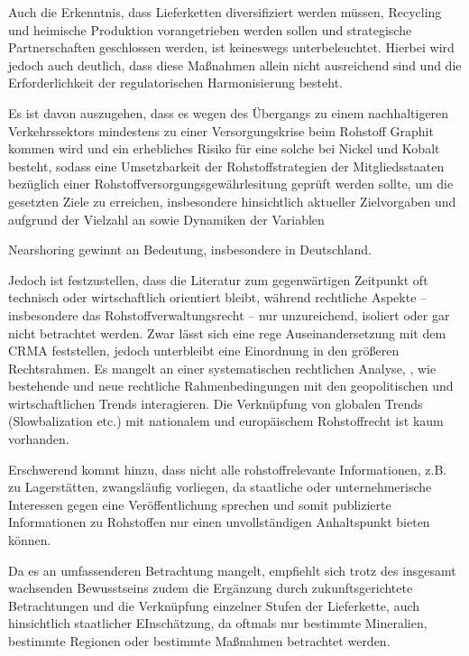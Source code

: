\documentclass[12pt,a4paper,oneside]{book} %
\begin{document}
Auch die Erkenntnis, dass Lieferketten diversifiziert werden müssen, Recycling und heimische Produktion vorangetrieben werden sollen und strategische Partnerschaften geschlossen werden, ist keineswegs unterbeleuchtet.\autocite{https://klardenker.kpmg.de/so-sichert-sich-die-automobilindustrie-kritische-rohstoffe-2/} Hierbei wird jedoch auch deutlich, dass diese Maßnahmen allein nicht ausreichend sind und die Erforderlichkeit der regulatorischen Harmonisierung besteht.

Es ist davon auszugehen, dass es wegen des Übergangs zu einem nachhaltigeren Verkehrssektors mindestens zu einer Versorgungskrise beim Rohstoff Graphit kommen wird und ein erhebliches Risiko für eine solche bei Nickel und Kobalt besteht, sodass eine Umsetzbarkeit der Rohstoffstrategien der Mitgliedsstaaten bezüglich einer Rohstoffversorgungsgewährlesitung geprüft werden sollte, um die gesetzten Ziele zu erreichen, insbesondere hinsichtlich aktueller Zielvorgaben und aufgrund der Vielzahl an sowie Dynamiken der Variablen\autocite{Nagy, Will the EU have enough minerals to drive their electric dreams by 2030?}

Nearshoring gewinnt an Bedeutung, insbesondere in Deutschland.

Jedoch ist festzustellen, dass die Literatur zum gegenwärtigen Zeitpunkt oft technisch oder wirtschaftlich orientiert bleibt, während rechtliche Aspekte -- insbesondere das Rohstoffverwaltungsrecht -- nur unzureichend, isoliert oder gar nicht betrachtet werden. Zwar lässt sich eine rege Auseinandersetzung mit dem CRMA feststellen, jedoch unterbleibt eine Einordnung in den größeren Rechtsrahmen. Es mangelt an einer systematischen rechtlichen Analyse, , wie bestehende und neue rechtliche Rahmenbedingungen mit den geopolitischen und wirtschaftlichen Trends interagieren. Die Verknüpfung von globalen Trends (Slowbalization etc.) mit nationalem und europäischem Rohstoffrecht ist kaum vorhanden.



Erschwerend kommt hinzu, dass nicht alle rohstoffrelevante Informationen, z.B. zu Lagerstätten, zwangsläufig vorliegen, da staatliche oder unternehmerische Interessen gegen eine Veröffentlichung sprechen und somit publizierte Informationen zu Rohstoffen nur einen unvollständigen Anhaltspunkt bieten können.\autocite{Frenz 2025, S,. 83}

Da es an umfassenderen Betrachtung mangelt, empfiehlt sich trotz des insgesamt wachsenden Bewusstseins zudem die Ergänzung durch zukunftsgerichtete Betrachtungen und die Verknüpfung einzelner Stufen der Lieferkette, auch hinsichtlich staatlicher EInschätzung, da oftmals nur bestimmte Mineralien, bestimmte Regionen oder bestimmte Maßnahmen betrachtet werden.\autocite{Resilience of Critical Minerals Supply Chain, Cambirdge, S. 30}
\end{document}

